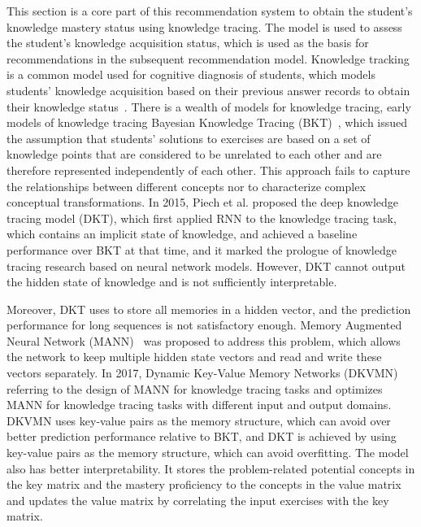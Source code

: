 This section is a core part of this recommendation system to obtain the student's knowledge mastery status using knowledge tracing. The model is used to assess the student's knowledge acquisition status, which is used as the basis for recommendations in the subsequent recommendation model. Knowledge tracking is a common model used for cognitive diagnosis of students, which models students' knowledge acquisition based on their previous answer records to obtain their knowledge status~\cite{gonzalez2014general}. There is a wealth of models for knowledge tracing, early models of knowledge tracing Bayesian Knowledge Tracing (BKT)~\cite{yudelson2013individualized}, which issued the assumption that students' solutions to exercises are based on a set of knowledge points that are considered to be unrelated to each other and are therefore represented independently of each other. This approach fails to capture the relationships between different concepts nor to characterize complex conceptual transformations. In 2015, Piech et al. proposed the deep knowledge tracing model (DKT), which first applied RNN to the knowledge tracing task, which contains an implicit state of knowledge, and achieved a baseline performance over BKT at that time, and it marked the prologue of knowledge tracing research based on neural network models. However, DKT cannot output the hidden state of knowledge and is not sufficiently interpretable.

Moreover, DKT uses to store all memories in a hidden vector, and the prediction performance for long sequences is not satisfactory enough. Memory Augmented Neural Network (MANN)~\cite{santoro2016meta} was proposed to address this problem, which allows the network to keep multiple hidden state vectors and read and write these vectors separately. In 2017, Dynamic Key-Value Memory Networks (DKVMN)~\cite{zhang2017dynamic} referring to the design of MANN for knowledge tracing tasks and optimizes MANN for knowledge tracing tasks with different input and output domains. DKVMN uses key-value pairs as the memory structure, which can avoid over better prediction performance relative to BKT, and DKT is achieved by using key-value pairs as the memory structure, which can avoid overfitting. The model also has better interpretability. It stores the problem-related potential concepts in the key matrix and the mastery proficiency to the concepts in the value matrix and updates the value matrix by correlating the input exercises with the key matrix.

